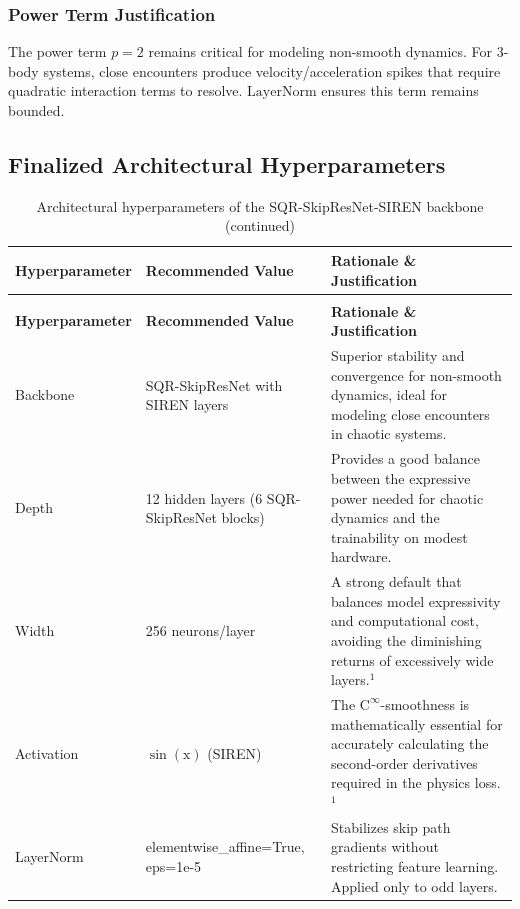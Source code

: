\subsubsection*{Power Term Justification}
The power term $p = 2$ remains critical for modeling non-smooth dynamics. For 3-body systems, close encounters produce velocity/acceleration spikes that require quadratic interaction terms to resolve. $\text{LayerNorm}$ ensures this term remains bounded.
\subsection{Finalized Architectural Hyperparameters}

\begin{longtable}{|p{3cm}|p{5cm}|p{8cm}|}
\caption{Architectural hyperparameters of the SQR-SkipResNet-SIREN backbone}\label{tab:architectural_hyperparameters}\\
\hline
\textbf{Hyperparameter} & \textbf{Recommended Value} & \textbf{Rationale \& Justification} \\
\hline
\endfirsthead
\caption[]{Architectural hyperparameters of the SQR-SkipResNet-SIREN backbone (continued)}\\
\hline
\textbf{Hyperparameter} & \textbf{Recommended Value} & \textbf{Rationale \& Justification} \\
\hline
\endhead
\hline
\endfoot
\hline
\endlastfoot
Backbone & SQR-SkipResNet with SIREN layers & Superior stability and convergence for non-smooth dynamics, ideal for modeling close encounters in chaotic systems. \\
\hline
Depth & 12 hidden layers (6 SQR-SkipResNet blocks) & Provides a good balance between the expressive power needed for chaotic dynamics and the trainability on modest hardware. \\
\hline
Width & 256 neurons/layer & A strong default that balances model expressivity and computational cost, avoiding the diminishing returns of excessively wide layers.$^1$ \\
\hline
Activation & $\sin(\mathrm{x})$ (SIREN) & The $\mathrm{C}^\infty$-smoothness is mathematically essential for accurately calculating the second-order derivatives required in the physics loss.$^1$ \\
\hline
LayerNorm & elementwise\_affine=True, eps=1e-5 & Stabilizes skip path gradients without restricting feature learning. Applied only to odd layers.\\
\hline

\end{longtable}
